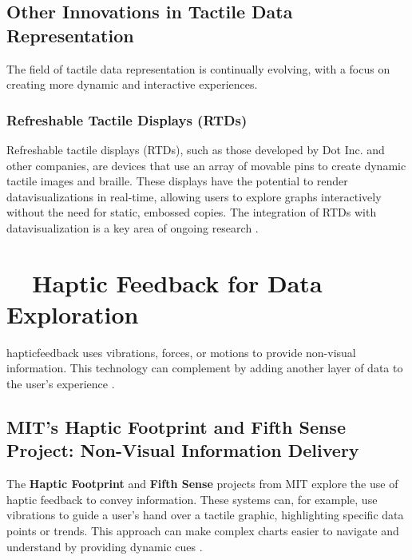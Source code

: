 \subsection{Other Innovations in Tactile Data Representation}\label{ch13:ssec:tactile-innovations}
The field of tactile data representation is continually evolving, with a focus on creating more dynamic and interactive experiences.

\subsubsection{Refreshable Tactile Displays (RTDs)}\label{ch13:sssec:rtds}
Refreshable tactile displays (RTDs), such as those developed by Dot Inc. and other companies, are devices that use an array of movable pins to create dynamic tactile images and braille. These displays have the potential to render \gls{datavisualization}s in real-time, allowing users to explore graphs interactively without the need for static, embossed copies. The integration of RTDs with \gls{datavisualization}  is a key area of ongoing research \supercite{DotInc, OrbitGraphiti}.

\section{~~Haptic Feedback for Data Exploration}\label{ch13:sec:haptic-feedback}
\gls{hapticfeedback} uses vibrations, forces, or motions to provide non-visual information. This technology can complement  by adding another layer of data to the user's experience \supercite{HapticDataViz}.

\subsection{MIT's Haptic Footprint and Fifth Sense Project: Non-Visual Information Delivery}\label{ch13:ssec:haptic-footprint}
The \textbf{Haptic Footprint} and \textbf{Fifth Sense} projects from MIT explore the use of haptic feedback to convey information. These systems can, for example, use vibrations to guide a user's hand over a tactile graphic, highlighting specific data points or trends. This approach can make complex charts easier to navigate and understand by providing dynamic cues \supercite{HapticFootprint, MITFifthSense}.

